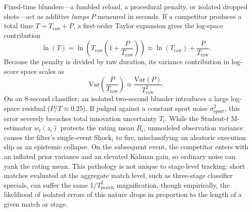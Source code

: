 \documentclass[12pt]{article}
\newcommand{\ssport}{\sigma_{\mathrm{sport}}^2}      %
\begin{document}
	Fixed-time blunders---a fumbled reload, a procedural penalty, or isolated dropped shots---act as additive \textit{lumps} $P$ measured in seconds. If a competitor produces a total time $T = T_{\mathrm{raw}} + P$, a first-order Taylor expansion gives the log-space contribution
	\begin{equation}
		\ln(T) = \ln\left(T_{\mathrm{raw}}\left(1 + \frac{P}{T_{\mathrm{raw}}}\right)\right) \approx \ln(T_{\mathrm{raw}}) + \frac{P}{T_{\mathrm{raw}}}.
	\end{equation}
	Because the penalty is divided by raw duration, its variance contribution in log-score space scales as
	\begin{equation}
		\mathrm{Var}\!\left(\frac{P}{T_{\mathrm{raw}}}\right) \approx \frac{\mathrm{Var}(P)}{T_{\mathrm{raw}}^2}.
	\end{equation}
	On an 8-second classifier, an isolated two-second blunder introduces a large log-space residual ($P/T \approx 0.25$). If judged against a constant sport noise $\ssport$, this error severely breaches total innovation uncertainty $T_i$. While the Student-$t$ M-estimator $w_t(z_i)$ protects the rating mean $R_i$, unmodeled observation variance causes the filter's single-event $\text{Shock}_i$ to fire, misclassifying an aleatoric execution slip as an epistemic collapse. On the subsequent event, the competitor enters with an inflated prior variance and an elevated Kalman gain, so ordinary noise can yank the rating mean. This pathology is not unique to stage-level tracking: short matches evaluated at the aggregate match level, such as three-stage classifier specials, can suffer the same $1/T_{\mathrm{match}}^2$ magnification, though empirically, the likelihood of isolated errors of this nature drops in proportion to the length of a given match or stage.
	
\end{document}
